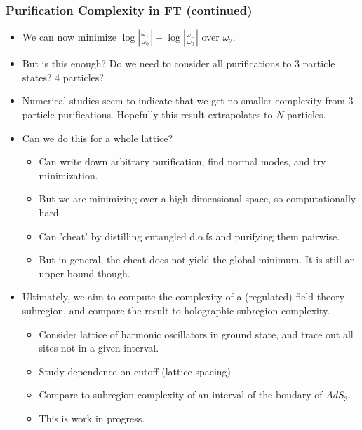 \documentclass[10pt,aspectratio=169]{beamer}
\begin{document}
\begin{frame}
\frametitle{Purification Complexity in FT (continued)}

\begin{itemize}

\item We can now minimize $\log \left|\frac{\omega_+}{\omega_0} \right| + \log \left| \frac{\omega_-}{\omega_0} \right|$ over $\omega_2$.

\item But is this enough? Do we need to consider all purifications to 3 particle states? 4 particles?

\item Numerical studies seem to indicate that we get no smaller complexity from 3-particle purifications. Hopefully this result extrapolates to $N$ particles.

\item Can we do this for a whole lattice? 

\begin{itemize}

	\item Can write down arbitrary purification, find normal modes, and try minimization.
	
	\item But we are minimizing over a high dimensional space, so computationally hard
	
	\item Can 'cheat' by distilling entangled d.o.fs and purifying them pairwise.
	
	\item But in general, the cheat does not yield the global minimum. It is still an upper bound though.

\end{itemize} 

\item Ultimately, we aim to compute the complexity of a (regulated) field theory subregion, and compare the result to holographic subregion complexity.

\begin{itemize}
	
	\item Consider lattice of harmonic oscillators in ground state, and trace out all sites not in a given interval.
	
	\item Study dependence on cutoff (lattice spacing)
	
	\item Compare to subregion complexity of an interval of the boudary of $AdS_3$.	
	
	\item This is work in progress.
	
\end{itemize}

\end{itemize} 

\end{frame}
\end{document}
